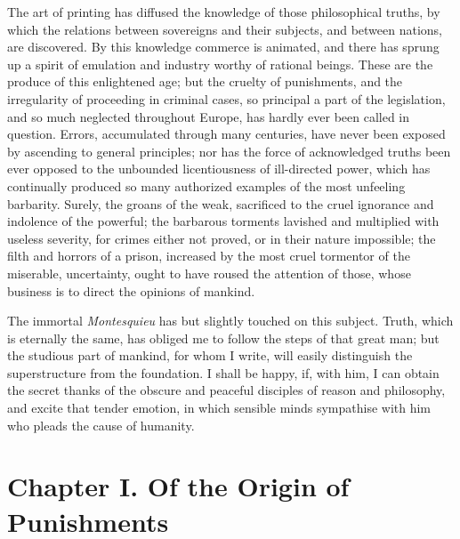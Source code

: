 The art of printing has diffused the knowledge of those
philosophical truths, by which the relations between sovereigns and
their subjects, and between nations, are discovered. By this knowledge
commerce is animated, and there has sprung up a spirit of emulation
and industry worthy of rational beings. These are the produce of this
enlightened age; but the cruelty of punishments, and the irregularity
of proceeding in criminal cases, so principal a part of the
legislation, and so much neglected throughout Europe, has hardly ever
been called in question. Errors, accumulated through many centuries,
have never been exposed by ascending to general principles; nor has
the force of acknowledged truths been ever opposed to the unbounded
licentiousness of ill-directed power, which has continually produced
so many authorized examples of the most unfeeling barbarity. Surely,
the groans of the weak, sacrificed to the cruel ignorance and
indolence of the powerful; the barbarous torments lavished and
multiplied with useless severity, for crimes either not proved, or in
their nature impossible; the filth and horrors of a prison, increased
by the most cruel tormentor of the miserable, uncertainty, ought to
have roused the attention of those, whose business is to direct the
opinions of mankind.

The immortal \textit{Montesquieu} has but slightly touched on
this subject. Truth, which is eternally the same, has obliged me to
follow the steps of that great man; but the studious part of mankind,
for whom I write, will easily distinguish the superstructure from the
foundation. I shall be happy, if, with him, I can obtain the secret
thanks of the obscure and peaceful disciples of reason and philosophy,
and excite that tender emotion, in which sensible minds sympathise
with him who pleads the cause of humanity.

\section*{Chapter I. Of the Origin of Punishments}


